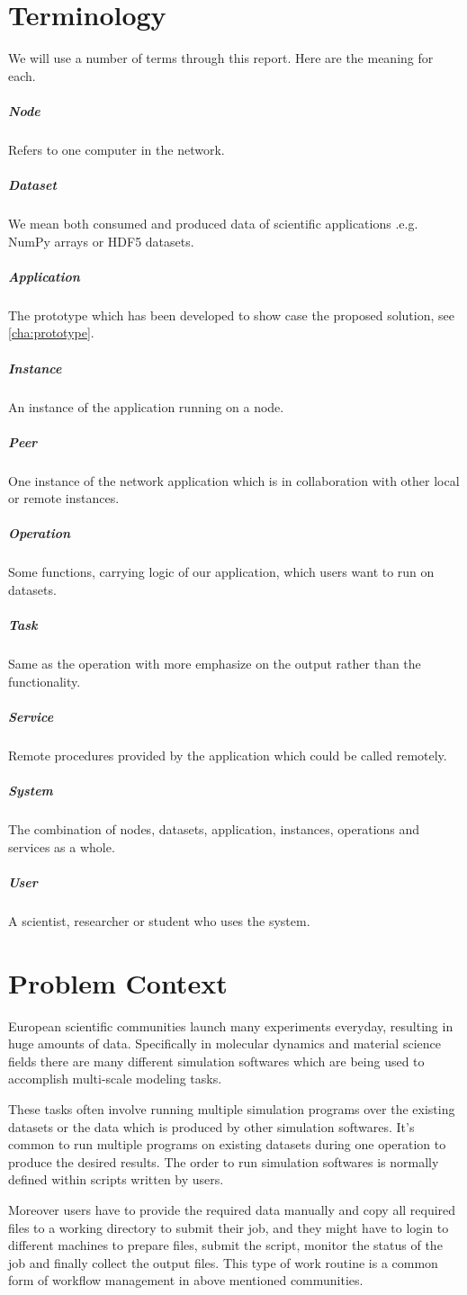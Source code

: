 \section{Terminology}
We will use a number of terms through this report. Here are the meaning for each.
\subparagraph{Node}
Refers to one computer in the network.
\subparagraph{Dataset}
We mean both consumed and produced data of scientific applications .e.g. NumPy arrays or HDF5 datasets.
\subparagraph{Application}
The prototype which has been developed to show case the proposed solution, see \ref{cha:prototype}.
\subparagraph{Instance}
An instance of the application running on a node.
\subparagraph{Peer}
One instance of the network application which is in collaboration with other local or remote instances.
\subparagraph{Operation}
Some functions, carrying logic of our application, which users want to run on datasets.
\subparagraph{Task}
Same as the operation with more emphasize on the output rather than the functionality.
\subparagraph{Service}
Remote procedures provided by the application which could be called remotely.
\subparagraph{System}
The combination of nodes, datasets, application, instances, operations and services as a whole.
\subparagraph{User}
A scientist, researcher or student who uses the system.

\section{Problem Context}
European scientific communities launch many experiments everyday, resulting in huge amounts
of data. Specifically in molecular dynamics and material science fields there are many different
simulation softwares which are being used to accomplish multi-scale modeling tasks. 

These tasks often involve running multiple simulation programs over the existing datasets or the data which is
produced by other simulation softwares. It's common to run multiple programs on existing datasets
during one operation to produce the desired results. The order to run simulation softwares is normally 
defined within scripts written by users. 

Moreover users have to provide the required data manually and copy all required files to a working
directory to submit their job, and they might have to login to different machines to prepare files,
submit the script, monitor the status of the job and finally collect the output files. 
This type of work routine is a common form of workflow management in above mentioned communities.

